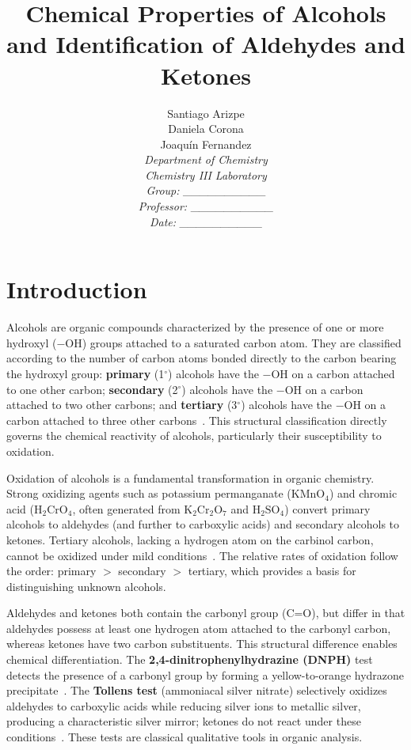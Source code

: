 \documentclass[12pt, a4paper]{article}
\title{\textbf{Chemical Properties of Alcohols and Identification of Aldehydes and Ketones}}
\author{
    Santiago Arizpe \\
    Daniela Corona \\
    Joaquín Fernandez \\[0.5cm]
    \textit{Department of Chemistry}\\
    \textit{Chemistry III Laboratory}\\
    \textit{Group: \_\_\_\_\_\_\_\_\_\_} \\
    \textit{Professor: \_\_\_\_\_\_\_\_\_\_} \\
    \textit{Date: \_\_\_\_\_\_\_\_\_\_}
}
\date{}
\begin{document}
\maketitle
\thispagestyle{empty}
\newpage

\tableofcontents
\newpage

\section{Introduction}

Alcohols are organic compounds characterized by the presence of one or more hydroxyl ($-\text{OH}$) groups attached to a saturated carbon atom. They are classified according to the number of carbon atoms bonded directly to the carbon bearing the hydroxyl group: \textbf{primary} (1$^\circ$) alcohols have the $-\text{OH}$ on a carbon attached to one other carbon; \textbf{secondary} (2$^\circ$) alcohols have the $-\text{OH}$ on a carbon attached to two other carbons; and \textbf{tertiary} (3$^\circ$) alcohols have the $-\text{OH}$ on a carbon attached to three other carbons~\cite{mcmurry2016}. This structural classification directly governs the chemical reactivity of alcohols, particularly their susceptibility to oxidation.

Oxidation of alcohols is a fundamental transformation in organic chemistry. Strong oxidizing agents such as potassium permanganate ($\text{KMnO}_4$) and chromic acid ($\text{H}_2\text{CrO}_4$, often generated from $\text{K}_2\text{Cr}_2\text{O}_7$ and $\text{H}_2\text{SO}_4$) convert primary alcohols to aldehydes (and further to carboxylic acids) and secondary alcohols to ketones. Tertiary alcohols, lacking a hydrogen atom on the carbinol carbon, cannot be oxidized under mild conditions~\cite{carey2017}. The relative rates of oxidation follow the order: primary $>$ secondary $>$ tertiary, which provides a basis for distinguishing unknown alcohols.

Aldehydes and ketones both contain the carbonyl group ($\text{C=O}$), but differ in that aldehydes possess at least one hydrogen atom attached to the carbonyl carbon, whereas ketones have two carbon substituents. This structural difference enables chemical differentiation. The \textbf{2,4-dinitrophenylhydrazine (DNPH)} test detects the presence of a carbonyl group by forming a yellow-to-orange hydrazone precipitate~\cite{pavia2013}. The \textbf{Tollens test} (ammoniacal silver nitrate) selectively oxidizes aldehydes to carboxylic acids while reducing silver ions to metallic silver, producing a characteristic silver mirror; ketones do not react under these conditions~\cite{vogel1996}. These tests are classical qualitative tools in organic analysis.
\end{document}
